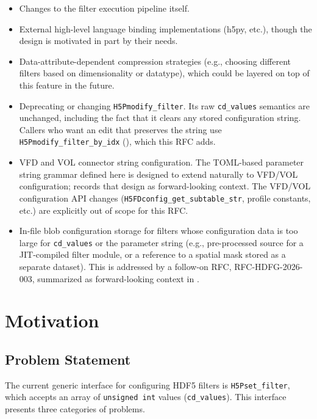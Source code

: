 \documentclass[../RFC-HDFG-2026-001.tex]{subfiles}
\begin{document}
\begin{itemize}
\item Changes to the filter execution pipeline itself.
\item External high-level language binding implementations (h5py, etc.), though
  the design is motivated in part by their needs.
\item Data-attribute-dependent compression strategies (e.g., choosing different
  filters based on dimensionality or datatype), which could be layered on top
  of this feature in the future.
\item Deprecating or changing \texttt{H5Pmodify\_filter}.  Its raw
  \texttt{cd\_values} semantics are unchanged, including the fact that it
  clears any stored configuration string.  Callers who want an edit that
  preserves the string use \texttt{H5Pmodify\_filter\_by\_idx}
  (), which this RFC adds.
\item VFD and VOL connector string configuration.  The TOML-based parameter
  string grammar defined here is designed to extend naturally to VFD/VOL
  configuration;  records that design as
  forward-looking context.  The VFD/VOL configuration API changes
  (\texttt{H5FDconfig\_get\_subtable\_str}, profile constants, etc.) are
  explicitly out of scope for this RFC.
\item In-file blob configuration storage for filters whose configuration
  data is too large for \texttt{cd\_values} or the parameter string (e.g.,
  pre-processed source for a JIT-compiled filter module, or a reference to
  a spatial mask stored as a separate dataset).  This is addressed by a
  follow-on RFC, RFC-HDFG-2026-003, summarized as forward-looking context
  in .
\end{itemize}


\section{Motivation}
\label{sec:motivation}

\subsection{Problem Statement}

The current generic interface for configuring HDF5 filters is \texttt{H5Pset\_filter},
which accepts an array of \texttt{unsigned int} values (\texttt{cd\_values}). This interface
presents three categories of problems.
\end{document}
